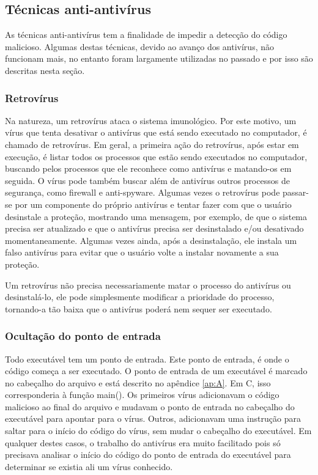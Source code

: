 \subsection{Técnicas anti-antivírus}
As técnicas anti-antivírus tem a finalidade de impedir a detecção do código malicioso. Algumas destas técnicas, devido ao avanço dos antivírus, não funcionam mais, no entanto foram largamente utilizadas no passado e por isso são descritas nesta seção.
\subsubsection{Retrovírus}
Na natureza, um retrovírus ataca o sistema imunológico. Por este motivo, um vírus que tenta desativar o antivírus que está sendo executado no computador, é chamado de retrovírus. Em geral, a primeira ação do retrovírus, após estar em execução, é listar todos os processos que estão sendo executados no computador, buscando pelos processos que ele reconhece como antivírus e matando-os em seguida. O vírus pode também buscar além de antivírus outros processos de segurança, como firewall e anti-spyware. Algumas vezes o retrovírus pode passar-se por um componente do próprio antivírus e tentar fazer com que o usuário desinstale a proteção\cite{symantec:1}, mostrando uma mensagem, por exemplo, de que o sistema precisa ser atualizado e que o antivírus precisa ser desinstalado e/ou desativado momentaneamente. Algumas vezes ainda, após a desinstalação, ele instala um falso antivírus para evitar que o usuário volte a instalar novamente a sua proteção.

Um retrovírus não precisa necessariamente matar o processo do antivírus ou desinstalá-lo, ele pode simplesmente modificar a prioridade do processo, tornando-a tão baixa que o antivírus poderá nem sequer ser executado.

\subsubsection{Ocultação do ponto de entrada}
Todo executável tem um ponto de entrada. Este ponto de entrada, é onde o código começa a ser executado. O ponto de entrada de um executável é marcado no cabeçalho do arquivo e está descrito no apêndice \ref{ap:A}. Em C, isso corresponderia à função main(). Os primeiros vírus adicionavam o código malicioso ao final do arquivo e mudavam o ponto de entrada no cabeçalho do executável para apontar para o vírus. Outros, adicionavam uma instrução para saltar para o início do código do vírus, sem mudar o cabeçalho do executável. Em qualquer destes casos, o trabalho do antivírus era muito facilitado pois só precisava analisar o início do código do ponto de entrada do executável para determinar se existia ali um vírus conhecido. 

